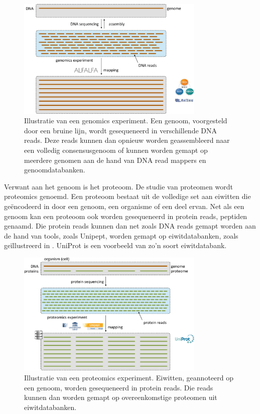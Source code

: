 \begin{figure}
	\centering
	\includegraphics[width=0.8\textwidth]{includes/genomics}
	\caption{Illustratie van een genomics experiment. Een genoom, voorgesteld 
	door een bruine lijn, wordt gesequeneerd in verschillende DNA reads. Deze 
	reads kunnen dan opnieuw worden geassembleerd naar een volledig 
	consensusgenoom of kunnen worden gemapt op meerdere genomen aan de hand van 
	DNA read 
	mappers en genoomdatabanken.}
	\label{fig:genomics}
\end{figure}

Verwant aan het genoom is het proteoom. De studie van proteomen wordt proteomics
genoemd. Een proteoom bestaat uit de volledige set aan eiwitten die geëncodeerd
in door een genoom, een organisme of een deel ervan. Net als een genoom kan een
proteoom ook worden gesequeneerd in protein reads, peptiden genaamd. Die protein
reads kunnen dan net zoals DNA reads gemapt worden aan de hand van tools, zoals
Unipept\cites{mesuere2012unipept, mesuere2014unipept}, worden gemapt op
eiwitdatabanken, zoals geïllustreerd in .
UniProt\cite{uniprot2014uniprot} is een voorbeeld van zo'n soort eiwitdatabank.

\begin{figure}
	\centering
	\includegraphics[width=0.8\textwidth]{includes/proteomics}
	\caption{Illustratie van een proteomics experiment. Eiwitten, geannoteerd 
	op een genoom, worden gesequeneerd in protein reads. Die reads kunnen dan 
	worden gemapt op overeenkomstige proteomen uit eiwitdatabanken.}
	\label{fig:proteomics}
\end{figure}

